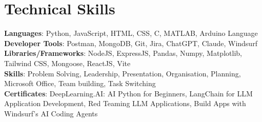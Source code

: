 \documentclass[letterpaper,11pt]{article}
\begin{document}
\section{Technical Skills}
 \begin{itemize}[leftmargin=0.15in, label={}]
    \small{\item{   
     \textbf{Languages}{: Python, JavaScript, HTML, CSS, C, MATLAB, Arduino Language} \\[1mm]
     \textbf{Developer Tools}{: Postman, MongoDB, Git, Jira, ChatGPT, Claude, Windsurf} \\[1mm]
     \textbf{Libraries/Frameworks}{: NodeJS, ExpressJS, Pandas, Numpy, Matplotlib, Tailwind CSS, Mongoose, ReactJS, Vite} \\ [1mm]
     \textbf{Skills}{: Problem Solving, Leadership, Presentation, Organisation, Planning, Microsoft Office, Team building, Task Switching} \\ [1mm]
     \textbf{Certificates}{: DeepLearning.AI: AI Python for Beginners, LangChain for LLM Application Development, Red Teaming LLM Applications, Build Apps with Windsurf's AI Coding Agents} \\ [1mm]
    }}
 \end{itemize}
 \vspace{-16pt}
 \vspace{3pt}
\vspace{10pt}

\vspace{-15pt}
\end{document}
